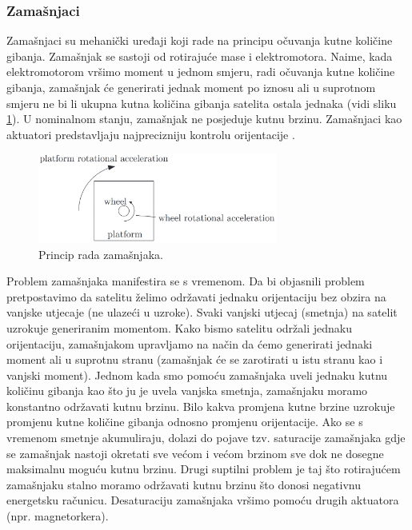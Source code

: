 \documentclass[times, utf8, diplomski, numeric]{templates/template}
\begin{document}
{{{            \subsubsection{Zamašnjaci }{
                Zamašnjaci su mehanički uređaji koji rade na principu očuvanja kutne količine gibanja. Zamašnjak se sastoji od rotirajuće mase i elektromotora. Naime, kada elektromotorom vršimo moment u jednom smjeru, radi očuvanja kutne količine gibanja, zamašnjak će generirati jednak moment po iznosu ali u suprotnom smjeru ne bi li ukupna kutna količina gibanja satelita ostala jednaka (vidi sliku \ref{fig:zamasnjak_fig}). U nominalnom stanju, zamašnjak ne posjeduje kutnu brzinu. Zamašnjaci kao aktuatori predstavljaju najprecizniju kontrolu orijentacije \cite{adcsKnjiga}.

                \begin{figure}[htb]
                \centering
                \includegraphics[width=0.7\textwidth]{images/zamasnjak.png}
                \caption{Princip rada zamašnjaka.}
                \label{fig:zamasnjak_fig}
                \end{figure}

                Problem zamašnjaka manifestira se s vremenom. Da bi objasnili problem pretpostavimo da satelitu želimo održavati jednaku orijentaciju bez obzira na vanjske utjecaje (ne ulazeći u uzroke). Svaki vanjski utjecaj (smetnja) na satelit uzrokuje generiranim momentom. Kako bismo satelitu održali jednaku orijentaciju, zamašnjakom upravljamo na način da ćemo generirati jednaki moment ali u suprotnu stranu (zamašnjak će se zarotirati u istu stranu kao i vanjski moment). Jednom kada smo pomoću zamašnjaka uveli jednaku kutnu količinu gibanja kao što ju je uvela vanjska smetnja, zamašnjaku moramo konstantno održavati kutnu brzinu. Bilo kakva promjena kutne brzine uzrokuje promjenu kutne količine gibanja odnosno promjenu orijentacije. Ako se s vremenom smetnje akumuliraju, dolazi do pojave tzv. saturacije zamašnjaka gdje se zamašnjak nastoji okretati sve većom i većom brzinom sve dok ne dosegne maksimalnu moguću kutnu brzinu. Drugi suptilni problem je taj što rotirajućem zamašnjaku stalno moramo održavati kutnu brzinu što donosi negativnu energetsku računicu. Desaturaciju zamašnjaka vršimo pomoću drugih aktuatora (npr. magnetorkera).

}}}}
\end{document}
